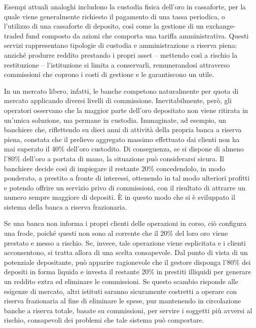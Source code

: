 \documentclass[
  a5paper,
  smalldemyvopaper,10pt,twoside,onecolumn,openright,extrafontsizes,hidelinks]{memoir}
\begin{document}
Esempi attuali analoghi includono la custodia fisica dell'oro in
cassaforte, per la quale viene generalmente richiesto il pagamento di
una tassa periodica, o l'utilizzo di una cassaforte di deposito, così
come la gestione di un exchange-traded fund composto da azioni che
comporta una tariffa amministrativa. Questi servizi rappresentano
tipologie di custodia e amministrazione a riserva piena: anziché
produrre reddito prestando i propri asset -- mettendo così a rischio la
restituzione -- l'istituzione si limita a conservarli, remunerandosi
attraverso commissioni che coprono i costi di gestione e le garantiscono
un utile.

In un mercato libero, infatti, le banche competono naturalmente per
quota di mercato applicando diversi livelli di commissione.
Inevitabilmente, però, gli operatori osservano che la maggior parte
dell'oro depositato non viene ritirata in un'unica soluzione, ma permane
in custodia. Immaginate, ad esempio, un banchiere che, riflettendo su
dieci anni di attività della propria banca a riserva piena, constata che
il prelievo aggregato massimo effettuato dai clienti non ha mai superato
il 40\% dell'oro custodito. Di conseguenza, se si dispone di almeno
l'80\% dell'oro a portata di mano, la situazione può considerarsi
sicura. Il banchiere decide così di impiegare il restante 20\%
concedendolo, in modo ponderato, a prestito a fronte di interessi,
ottenendo in tal modo ulteriori profitti e potendo offrire un servizio
privo di commissioni, con il risultato di attrarre un numero sempre
maggiore di depositi. È in questo modo che si è sviluppato il sistema
della banca a riserva frazionaria.

Se una banca non informa i propri clienti delle operazioni in corso, ciò
configura una frode, poiché questi non sono al corrente che il 20\% del
loro oro viene prestato e messo a rischio. Se, invece, tale operazione
viene esplicitata e i clienti acconsentono, si tratta allora di una
scelta consapevole. Dal punto di vista di un potenziale depositante, può
apparire ragionevole che il gestore disponga l'80\% dei depositi in
forma liquida e investa il restante 20\% in prestiti illiquidi per
generare un reddito extra ed eliminare le commissioni. Se questo scambio
risponde alle esigenze di mercato, altri istituti saranno sicuramente
costretti a operare con riserva frazionaria al fine di eliminare le
spese, pur mantenendo in circolazione banche a riserva totale, basate su
commissioni, per servire i soggetti più avversi al rischio, consapevoli
dei problemi che tale sistema può comportare.
\end{document}
